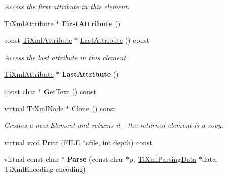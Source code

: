 \begin{DoxyCompactItemize}
\begin{DoxyCompactList}\small\item\em \-Access the first attribute in this element. \end{DoxyCompactList}\item 
\hypertarget{class_ti_xml_element_a4b33780fc565d38d6b54f640e0cf1737}{\hyperlink{class_ti_xml_attribute}{\-Ti\-Xml\-Attribute} $\ast$ {\bfseries \-First\-Attribute} ()}\label{class_ti_xml_element_a4b33780fc565d38d6b54f640e0cf1737}

\item 
\hypertarget{class_ti_xml_element_a86191b49f9177be132b85b14655f1381}{const \hyperlink{class_ti_xml_attribute}{\-Ti\-Xml\-Attribute} $\ast$ \hyperlink{class_ti_xml_element_a86191b49f9177be132b85b14655f1381}{\-Last\-Attribute} () const }\label{class_ti_xml_element_a86191b49f9177be132b85b14655f1381}

\begin{DoxyCompactList}\small\item\em \-Access the last attribute in this element. \end{DoxyCompactList}\item 
\hypertarget{class_ti_xml_element_a222f81cf06155cd108f2a68d4d176004}{\hyperlink{class_ti_xml_attribute}{\-Ti\-Xml\-Attribute} $\ast$ {\bfseries \-Last\-Attribute} ()}\label{class_ti_xml_element_a222f81cf06155cd108f2a68d4d176004}

\item 
const char $\ast$ \hyperlink{class_ti_xml_element_aa6dedd8a146acf3b1bc0903deb2d411a}{\-Get\-Text} () const 
\item 
\hypertarget{class_ti_xml_element_a13f6df105ebb1e8dc636e75cc883be32}{virtual \hyperlink{class_ti_xml_node}{\-Ti\-Xml\-Node} $\ast$ \hyperlink{class_ti_xml_element_a13f6df105ebb1e8dc636e75cc883be32}{\-Clone} () const }\label{class_ti_xml_element_a13f6df105ebb1e8dc636e75cc883be32}

\begin{DoxyCompactList}\small\item\em \-Creates a new \-Element and returns it -\/ the returned element is a copy. \end{DoxyCompactList}\item 
virtual void \hyperlink{class_ti_xml_element_ad9d0c008866982ab8d9aafae7e14d692}{\-Print} (\-F\-I\-L\-E $\ast$cfile, int depth) const 
\item 
\hypertarget{class_ti_xml_element_af95c9165159fd9dfdcc5b894a3fcf85b}{virtual const char $\ast$ {\bfseries \-Parse} (const char $\ast$p, \hyperlink{class_ti_xml_parsing_data}{\-Ti\-Xml\-Parsing\-Data} $\ast$data, \-Ti\-Xml\-Encoding encoding)}\label{class_ti_xml_element_af95c9165159fd9dfdcc5b894a3fcf85b}


\end{DoxyCompactItemize}
